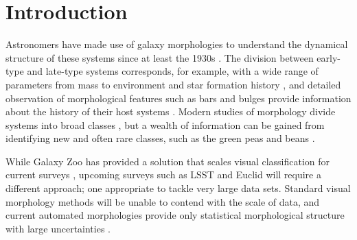 \documentclass[twocolumn]{aastex6}
\begin{document}


\section{Introduction} \label{sec:intro}

Astronomers have made use of galaxy morphologies to understand the dynamical structure of these systems since at least the 1930s \citep[e.g.,][]{Hubble1936}. The division between early-type and late-type systems corresponds, for example, with a wide range of parameters from mass to environment and star formation history \citep[e.g.,][]{Shen2003, Peng2010}, and detailed observation of morphological features such as bars and bulges provide information about the history of their host systems \citep[e.g., review by][]{KK04, Masters2010, Simmons2014}. Modern studies of morphology  divide systems into broad classes \citep[e.g.,][]{Conselice2006, Lintott2008, Kartaltepe2015, Peth2016}, but a wealth of information can be gained from identifying new and often rare classes, such as the green peas \citep{Cardamone2009} and beans \citep{Schirmer2016}. 


While Galaxy Zoo has provided a solution that scales visual classification for current surveys \citep{Willett2013, Willett2016, Simmons2016}, upcoming surveys such as LSST and Euclid will require a different approach; one appropriate to tackle very large data sets. Standard visual morphology methods will be unable to contend with the scale of data, and current automated morphologies provide only statistical morphological structure with large uncertainties \cite[e.g.,][]{Abraham1996, Bershady2000}. 
\end{document}
